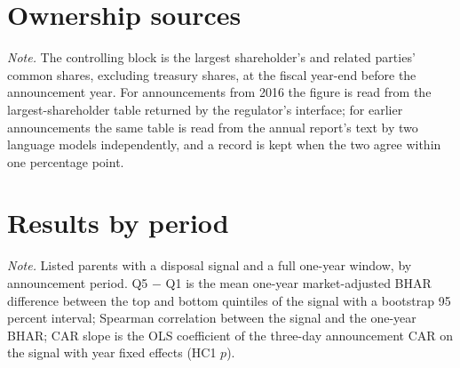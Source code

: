 \documentclass[12pt]{article}
\newcommand{\tabnote}[1]{\par\vspace{4pt}\begin{minipage}{\linewidth}\singlespacing\small\emph{Note.} #1\end{minipage}}
\begin{document}
\section{Ownership sources}
\begin{table}[htbp]\centering\caption{Pre-announcement ownership: two sources and their agreement}\label{tab:s_ownership}
{\footnotesize\setlength{\tabcolsep}{3pt}}\tabnote{The controlling block is the largest shareholder's and related parties' common shares, excluding treasury shares, at the fiscal year-end before the announcement year. For announcements from 2016 the figure is read from the largest-shareholder table returned by the regulator's interface; for earlier announcements the same table is read from the annual report's text by two language models independently, and a record is kept when the two agree within one percentage point.}\end{table}
\section{Results by period}
\begin{table}[htbp]\centering\caption{Headline return results by period}\label{tab:s_period}
{\footnotesize\setlength{\tabcolsep}{3pt}}\tabnote{Listed parents with a disposal signal and a full one-year window, by announcement period. Q5 $-$ Q1 is the mean one-year market-adjusted BHAR difference between the top and bottom quintiles of the signal with a bootstrap 95 percent interval; Spearman correlation between the signal and the one-year BHAR; CAR slope is the OLS coefficient of the three-day announcement CAR on the signal with year fixed effects (HC1 $p$).}\end{table}


\end{document}
